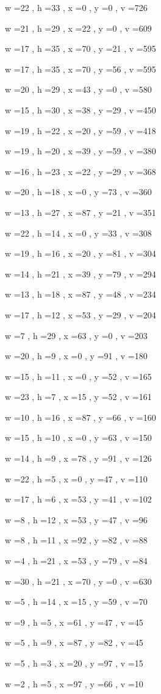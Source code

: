 \documentclass[11pt]{article}
\begin{document}
w =22 , h =33 , x =0 , y =0 , v =726
\par
w =21 , h =29 , x =22 , y =0 , v =609
\par
w =17 , h =35 , x =70 , y =21 , v =595
\par
w =17 , h =35 , x =70 , y =56 , v =595
\par
w =20 , h =29 , x =43 , y =0 , v =580
\par
w =15 , h =30 , x =38 , y =29 , v =450
\par
w =19 , h =22 , x =20 , y =59 , v =418
\par
w =19 , h =20 , x =39 , y =59 , v =380
\par
w =16 , h =23 , x =22 , y =29 , v =368
\par
w =20 , h =18 , x =0 , y =73 , v =360
\par
w =13 , h =27 , x =87 , y =21 , v =351
\par
w =22 , h =14 , x =0 , y =33 , v =308
\par
w =19 , h =16 , x =20 , y =81 , v =304
\par
w =14 , h =21 , x =39 , y =79 , v =294
\par
w =13 , h =18 , x =87 , y =48 , v =234
\par
w =17 , h =12 , x =53 , y =29 , v =204
\par
w =7 , h =29 , x =63 , y =0 , v =203
\par
w =20 , h =9 , x =0 , y =91 , v =180
\par
w =15 , h =11 , x =0 , y =52 , v =165
\par
w =23 , h =7 , x =15 , y =52 , v =161
\par
w =10 , h =16 , x =87 , y =66 , v =160
\par
w =15 , h =10 , x =0 , y =63 , v =150
\par
w =14 , h =9 , x =78 , y =91 , v =126
\par
w =22 , h =5 , x =0 , y =47 , v =110
\par
w =17 , h =6 , x =53 , y =41 , v =102
\par
w =8 , h =12 , x =53 , y =47 , v =96
\par
w =8 , h =11 , x =92 , y =82 , v =88
\par
w =4 , h =21 , x =53 , y =79 , v =84
\par
w =30 , h =21 , x =70 , y =0 , v =630
\par
w =5 , h =14 , x =15 , y =59 , v =70
\par
w =9 , h =5 , x =61 , y =47 , v =45
\par
w =5 , h =9 , x =87 , y =82 , v =45
\par
w =5 , h =3 , x =20 , y =97 , v =15
\par
w =2 , h =5 , x =97 , y =66 , v =10
\par
\newpage
\end{document}
